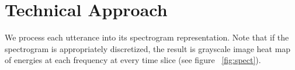 \documentclass[11pt]{article}
\begin{document}





\section{Technical Approach}

\begin{comment}
Describe the methods you intend to apply to solve the given problem
\end{comment}


We process each utterance into its spectrogram representation. Note that if the spectrogram is appropriately discretized, the result is grayscale image heat map of energies at each frequency at every time slice  (see figure ~\ref{fig:spect}).


\end{document}
